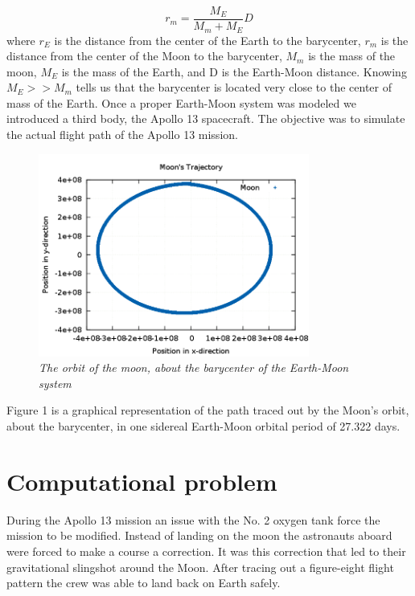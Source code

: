 \documentclass[11pt]{article}
\begin{document}
\begin{equation}
\label{rMb}
r_{m} = \frac {M_E}{M_{m}+M_{E}}D
\end{equation}
where $r_{E}$ is the distance from the center of the Earth to the barycenter, $r_{m}$ is the distance from the center of the 
Moon to the barycenter, $M_{m}$ is the mass of the moon, $M_{E}$ is the mass of the Earth, and D is the Earth-Moon distance.  
Knowing $M_{E} >> M_{m}$ tells us that the barycenter is located very close to the center of mass of the Earth.  Once a proper 
Earth-Moon system was modeled we introduced a third body, the Apollo 13 spacecraft.  The objective was to simulate the actual 
flight path of the Apollo 13 mission.
\begin{figure}[H]
  \begin{center}
\centerline{\includegraphics[width=3.5in]{1moonorbit.png}}
\caption{\it \small{The orbit of the moon, about the barycenter of the Earth-Moon system \label{fig1}}}
  \end{center}
\end{figure}
  Figure 1 is a graphical representation of the path traced out by the Moon's orbit,
about the barycenter, in one sidereal Earth-Moon orbital period of 27.322 days.


\section{Computational problem}
During the Apollo 13 mission an issue with the No. 2 oxygen tank force the mission to be modified.  Instead of landing on the 
moon the astronauts aboard were forced to make a course a correction.  It was this correction that led to their gravitational 
slingshot around the Moon.  After tracing out a figure-eight flight pattern the crew was able to land back on Earth safely.
\end{document}
